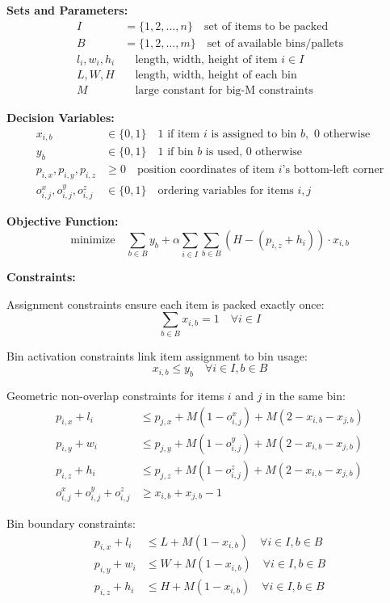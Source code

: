 \documentclass{article}
\begin{document}
\textbf{Sets and Parameters:}
\begin{align}
I &= \{1, 2, \ldots, n\} \quad \text{set of items to be packed} \\
B &= \{1, 2, \ldots, m\} \quad \text{set of available bins/pallets} \\
l_i, w_i, h_i &\quad \text{length, width, height of item } i \in I \\
L, W, H &\quad \text{length, width, height of each bin} \\
M &\quad \text{large constant for big-M constraints}
\end{align}

\textbf{Decision Variables:}
\begin{align}
x_{i,b} &\in \{0,1\} \quad \text{1 if item } i \text{ is assigned to bin } b, \text{ 0 otherwise} \\
y_b &\in \{0,1\} \quad \text{1 if bin } b \text{ is used, 0 otherwise} \\
p_{i,x}, p_{i,y}, p_{i,z} &\geq 0 \quad \text{position coordinates of item } i \text{'s bottom-left corner} \\
o_{i,j}^x, o_{i,j}^y, o_{i,j}^z &\in \{0,1\} \quad \text{ordering variables for items } i, j
\end{align}

\textbf{Objective Function:}
\[
\text{minimize} \quad \sum_{b \in B} y_b + \alpha \sum_{i \in I} \sum_{b \in B} (H - (p_{i,z} + h_i)) \cdot x_{i,b}
\]

\textbf{Constraints:}

Assignment constraints ensure each item is packed exactly once:
\[
\sum_{b \in B} x_{i,b} = 1 \quad \forall i \in I
\]

Bin activation constraints link item assignment to bin usage:
\[
x_{i,b} \leq y_b \quad \forall i \in I, b \in B
\]

Geometric non-overlap constraints for items $i$ and $j$ in the same bin:
\begin{align}
p_{i,x} + l_i &\leq p_{j,x} + M(1 - o_{i,j}^x) + M(2 - x_{i,b} - x_{j,b}) \\
p_{i,y} + w_i &\leq p_{j,y} + M(1 - o_{i,j}^y) + M(2 - x_{i,b} - x_{j,b}) \\
p_{i,z} + h_i &\leq p_{j,z} + M(1 - o_{i,j}^z) + M(2 - x_{i,b} - x_{j,b}) \\
o_{i,j}^x + o_{i,j}^y + o_{i,j}^z &\geq x_{i,b} + x_{j,b} - 1
\end{align}

Bin boundary constraints:
\begin{align}
p_{i,x} + l_i &\leq L + M(1 - x_{i,b}) \quad \forall i \in I, b \in B \\
p_{i,y} + w_i &\leq W + M(1 - x_{i,b}) \quad \forall i \in I, b \in B \\
p_{i,z} + h_i &\leq H + M(1 - x_{i,b}) \quad \forall i \in I, b \in B
\end{align}
\end{document}
